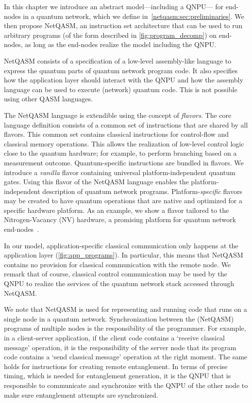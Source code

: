 In this chapter we introduce an abstract model---including a \ac{QNPU}--- for end-nodes in a quantum network, which we define in~\cref{netqasm:sec:preliminaries}.
We then propose \ac{NetQASM}, an instruction set architecture that can be used to run arbitrary programs (of the form described in \cref{fig:program_decomp}) on end-nodes, as long as the end-nodes realize the model including the QNPU.

\ac{NetQASM} consists of a specification of a low-level assembly-like language to express the quantum parts of quantum network program code.
It also specifies how the application layer should interact with the \ac{QNPU} and how the assembly language can be used to execute (network) quantum code.
This is not possible using other QASM languages.

The \ac{NetQASM} language is extendible using the concept of \textit{flavors}.
The core language definition consists of a common set of instructions that are shared by all flavors.
This common set contains classical instructions for control-flow and classical memory operations.
This allows the realization of low-level control logic close to the quantum hardware;
for example, to perform branching based on a measurement outcome.
Quantum-specific instructions are bundled in flavors.
We introduce a \textit{vanilla} flavor containing universal platform-independent quantum gates.
Using this flavor of the \ac{NetQASM} language enables the platform-independent description of quantum network programs.
Platform-\textit{specific} flavors may be created to have quantum operations that are native and optimized for a specific hardware platform.
As an example, we show a flavor tailored to the Nitrogen-Vacancy (NV) hardware, a promising platform for quantum network end-nodes~\cite{Taminiau2014, hanson2021realization}.

In our model, application-specific classical communication only happens at the application layer (\cref{fig:app_programs}).
In particular, this means that \ac{NetQASM} contains no provision for classical communication with the remote node.
We remark that of course, classical control communication may be used by the \ac{QNPU} to realize the services of the quantum network stack accessed through \ac{NetQASM}.

We note that \ac{NetQASM} is used for representing and running code that runs on a single node in a quantum network.
Synchronization between the (\ac{NetQASM}) programs of multiple nodes is the responsibility of the programmer.
For example, in a client-server application, if the client code contains a `receive classical message' operation, it is the responsibility of the server node that its program code contains a `send classical message' operation at the right moment.
The same holds for instructions for creating remote entanglement.
In terms of precise timing, which is needed for entanglement generation, it is the \ac{QNPU} that is responsible to communicate and synchronize with the \ac{QNPU} of the other node to make sure entanglement attempts are synchronized.

